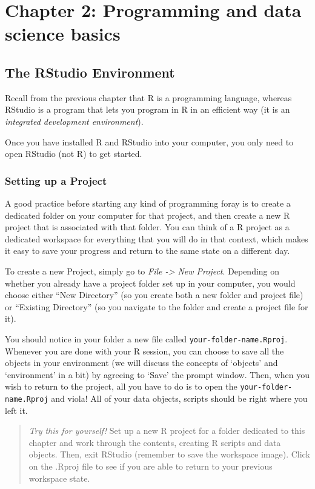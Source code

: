 \documentclass[
]{book}
\begin{document}
\chapter{Chapter 2: Programming and data science basics}\label{ch2}

\section{The RStudio Environment}\label{the-rstudio-environment}

Recall from the previous chapter that R is a programming language, whereas RStudio is a program that lets you program in R in an efficient way (it is an \emph{integrated development environment}).

Once you have installed R and RStudio into your computer, you only need to open RStudio (not R) to get started.

\subsection{Setting up a Project}\label{setting-up-a-project}

A good practice before starting any kind of programming foray is to create a dedicated folder on your computer for that project, and then create a new R project that is associated with that folder. You can think of a R project as a dedicated workspace for everything that you will do in that context, which makes it easy to save your progress and return to the same state on a different day.

To create a new Project, simply go to \emph{File -\textgreater{} New Project}. Depending on whether you already have a project folder set up in your computer, you would choose either ``New Directory'' (so you create both a new folder and project file) or ``Existing Directory'' (so you navigate to the folder and create a project file for it).

You should notice in your folder a new file called \texttt{your-folder-name.Rproj}. Whenever you are done with your R session, you can choose to save all the objects in your environment (we will discuss the concepts of `objects' and `environment' in a bit) by agreeing to `Save' the prompt window. Then, when you wish to return to the project, all you have to do is to open the \texttt{your-folder-name.Rproj} and viola! All of your data objects, scripts should be right where you left it.

\begin{quote}
\emph{Try this for yourself!} Set up a new R project for a folder dedicated to this chapter and work through the contents, creating R scripts and data objects. Then, exit RStudio (remember to save the workspace image). Click on the .Rproj file to see if you are able to return to your previous workspace state.
\end{quote}
\end{document}
